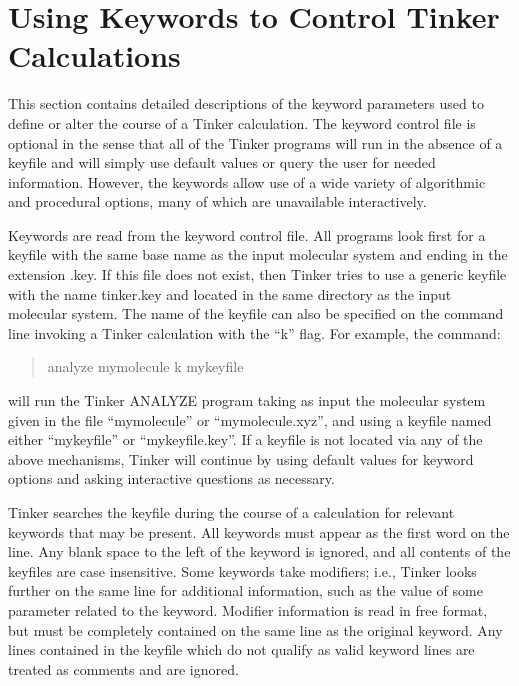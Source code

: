 \documentclass[letterpaper,11pt,english]{sphinxmanual}
\begin{document}
\section{Using Keywords to Control Tinker Calculations}
\label{\detokenize{text/keywords:using-keywords-to-control-tinker-calculations}}
\sphinxAtStartPar
This section contains detailed descriptions of the keyword parameters used to define or alter the course of a Tinker calculation. The keyword control file is optional in the sense that all of the Tinker programs will run in the absence of a keyfile and will simply use default values or query the user for needed information. However, the keywords allow use of a wide variety of algorithmic and procedural options, many of which are unavailable interactively.

\sphinxAtStartPar
Keywords are read from the keyword control file. All programs look first for a keyfile with the same base name as the input molecular system and ending in the extension .key. If this file does not exist, then Tinker tries to use a generic keyfile with the name tinker.key and located in the same directory as the input molecular system. The name of the keyfile can also be specified on the command line invoking a Tinker calculation with the “\sphinxhyphen{}k” flag. For example, the command:
\begin{quote}

\sphinxAtStartPar
analyze my\sphinxhyphen{}molecule \sphinxhyphen{}k my\sphinxhyphen{}keyfile
\end{quote}

\sphinxAtStartPar
will run the Tinker ANALYZE program taking as input the molecular system given in the file “my\sphinxhyphen{}molecule” or “my\sphinxhyphen{}molecule.xyz”, and using a keyfile named either “my\sphinxhyphen{}keyfile” or “my\sphinxhyphen{}keyfile.key”. If a keyfile is not located via any of the above mechanisms, Tinker will continue by using default values for keyword options and asking interactive questions as necessary.

\sphinxAtStartPar
Tinker searches the keyfile during the course of a calculation for relevant keywords that may be present. All keywords must appear as the first word on the line. Any blank space to the left of the keyword is ignored, and all contents of the keyfiles are case insensitive. Some keywords take modifiers; i.e., Tinker looks further on the same line for additional information, such as the value of some parameter related to the keyword. Modifier information is read in free format, but must be completely contained on the same line as the original keyword. Any lines contained in the keyfile which do not qualify as valid keyword lines are treated as comments and are ignored.
\end{document}
